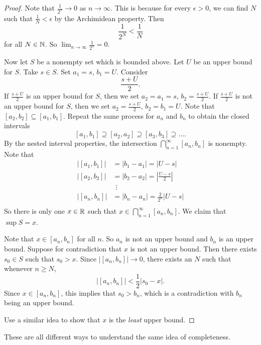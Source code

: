 \begin{proof}
  Note that $\frac{1}{2^n} \to 0$ as $n \to \infty$.
  This is because for
  every $\epsilon > 0$, we can find $N$ such that
  $\frac{1}{N} < \epsilon$ by the Archimidean property.
  Then
  \[
    \frac{1}{2^N} < \frac{1}{N}
  \]
  for all $N \in \mathbb{N}$. So
  $\lim_{n \to \infty} \frac{1}{2^n} = 0$.

  Now let $S$ be a nonempty set which is bounded above.
  Let $U$ be an upper bound for $S$. Take $s \in S$.
  Set $a_1 = s$, $b_1 = U$. Consider
  \[
    \frac{s + U}{2}
  .\]
  If $\frac{s + U}{2}$ is an upper bound for $S$, then
  we set $a_2 = a_1 = s$, $b_2 = \frac{s + U}{2}$. If
  $\frac{s + U}{2}$ is not an upper bound for $S$, then
  we set $a_2 = \frac{s + U}{2}$, $b_2 = b_1 = U$.
  Note that $[a_2, b_2] \subseteq [a_1, b_1]$.
  Repeat the same process for $a_n$ and $b_n$ to
  obtain the closed intervals
  \[[a_1, b_1] \supseteq [a_2, a_2] \supseteq [a_3, b_3] \supseteq \dots.\]
  By the nested interval properties, the intersection
  $\bigcap_{n = 1}^\infty [a_n, b_n]$ is nonempty.
  Note that
  \begin{align*}
    \left|[a_1, b_1]\right| &= |b_1 - a_1| = |U - s| \\
    \left|[a_2, b_2]\right| &= |b_2 - a_2| = \left|\frac{U - s}{2}\right| \\
                            &\ \ \vdots \\
    \left|[a_n, b_n]\right| &= |b_n - a_n| = \frac{2}{2^n}|U - s| \\
  \end{align*}
  So there is only one $x \in \mathbb{R}$ such that
  $x \in \bigcap_{n = 1}^\infty [a_n, b_n]$. We claim
  that $\sup S = x$.

  Note that $x \in [a_n, b_n]$ for all $n$. So
  $a_n$ is not an upper bound and $b_n$ is an upper bound.
  Suppose for contradiction that $x$ is not an upper bound.
  Then there exists $s_0 \in S$ such that $s_0 > x$.
  Since $|[a_n, b_n]| \to 0$, there exists an $N$ such
  that whenever $n \ge N$,
  \[
    |[a_n, b_n]| < \frac{1}{2}|s_0 - x|
  .\]
  Since $x \in [a_n, b_n]$, this implies that $s_0 > b_n$,
  which is a contradiction with $b_n$ being an upper bound.

  Use a similar idea to show that $x$ is the \textit{least}
  upper bound.
\end{proof}

\begin{remark}
  These are all different ways to understand the
  same idea of completeness.
\end{remark}
